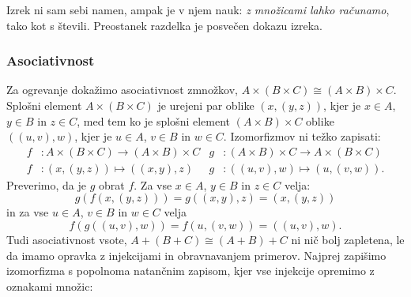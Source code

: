 Izrek ni sam sebi namen, ampak je v njem nauk: \emph{z množicami lahko računamo}, tako kot
s števili. Preostanek razdelka je posvečen dokazu izreka.

\subsubsection{Asociativnost}
\label{sec:asociativnost}

Za ogrevanje dokažimo asociativnost zmnožkov,
$A \times (B \times C) \cong (A \times B) \times C$. Splošni element
$A \times (B \times C)$ je urejeni par oblike $(x, (y, z))$, kjer je $x \in A$, $y \in B$
in $z \in C$, med tem ko je splošni element $(A \times B) \times C$ oblike $((u, v), w)$,
kjer je $u \in A$, $v \in B$ in $w \in C$. Izomorfizmov ni težko zapisati:
%
\begin{align*}
  f &:  A \times (B \times C) \to (A \times B) \times C &
  g &: (A \times B) \times C \to A \times (B \times C) \\
  f &: (x, (y, z)) \mapsto ((x, y), z) &
  g &: ((u, v), w) \mapsto (u, (v, w)).
\end{align*}
%
Preverimo, da je $g$ obrat $f$. Za vse $x \in A$, $y \in B$ in $z \in C$ velja:
%
\begin{equation*}
  g(f(x, (y, z))) = g((x, y), z) = (x, (y, z))
\end{equation*}
%
in za vse $u \in A$, $v \in B$ in $w \in C$ velja
%
\begin{equation*}
  f(g((u, v), w)) = f(u, (v, w)) = ((u, v), w).
\end{equation*}
%
Tudi asociativnost vsote, $A + (B + C) \cong (A + B) + C$ ni nič bolj zapletena, le da
imamo opravka z injekcijami in obravnavanjem primerov. Najprej zapišimo izomorfizma s
popolnoma natančnim zapisom, kjer vse injekcije opremimo z oznakami množic:
%
